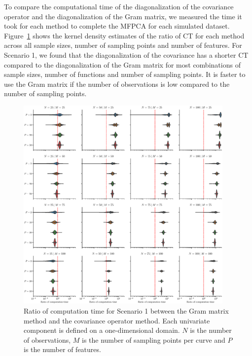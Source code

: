 \begin{results}
To compare the computational time of the diagonalization of the covariance operator and the diagonalization of the Gram matrix, we measured the time it took for each method to complete the MFPCA for each simulated dataset.
Figure~\ref{fig:computation_time_mfd_1d} shows the kernel density estimates of the ratio of CT for each method across all sample sizes, number of sampling points and number of features. For Scenario 1, we found that the diagonalization of the covariance has a shorter CT compared to the diagonalization of the Gram matrix for most combinations of sample sizes, number of functions and number of sampling points. It is faster to use the Gram matrix if the number of observations is low compared to the number of sampling points.
\begin{figure}
     \centering
    \includegraphics[width=0.95\textwidth]{figures/scenario_1/computation_time.eps}
    \caption{Ratio of computation time for Scenario 1 between the Gram matrix method and the covariance operator method. Each univariate component is defined on a one-dimensional domain. $N$ is the number of observations, $M$ is the number of sampling points per curve and $P$ is the number of features.}
    \label{fig:computation_time_mfd_1d}

\end{figure}
\end{results}
